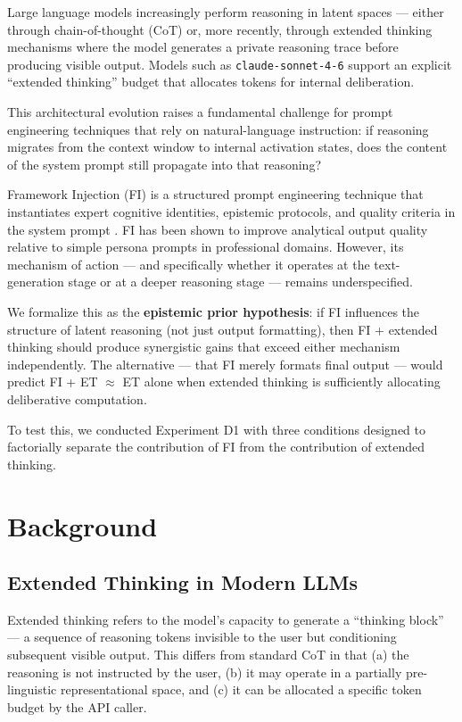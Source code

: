 \documentclass[11pt,a4paper]{article}
\begin{document}
Large language models increasingly perform reasoning in latent spaces — either
through chain-of-thought (CoT) \citep{wei2022chain} or, more recently, through
extended thinking mechanisms where the model generates a private reasoning trace
before producing visible output. Models such as \texttt{claude-sonnet-4-6}
support an explicit ``extended thinking'' budget that allocates tokens for
internal deliberation.

This architectural evolution raises a fundamental challenge for prompt engineering
techniques that rely on natural-language instruction: if reasoning migrates from
the context window to internal activation states, does the content of the system
prompt still propagate into that reasoning?

Framework Injection (FI) is a structured prompt engineering technique that
instantiates expert cognitive identities, epistemic protocols, and quality
criteria in the system prompt \citep{gomes2025fi}. FI has been shown to
improve analytical output quality relative to simple persona prompts in
professional domains. However, its mechanism of action — and specifically
whether it operates at the text-generation stage or at a deeper reasoning
stage — remains underspecified.

We formalize this as the \textbf{epistemic prior hypothesis}: if FI influences
the structure of latent reasoning (not just output formatting), then
FI + extended thinking should produce synergistic gains that exceed either
mechanism independently. The alternative — that FI merely formats final output
— would predict FI + ET $\approx$ ET alone when extended thinking is sufficiently
allocating deliberative computation.

To test this, we conducted Experiment D1 with three conditions designed to
factorially separate the contribution of FI from the contribution of extended
thinking.

\section{Background}

\subsection{Extended Thinking in Modern LLMs}

Extended thinking refers to the model's capacity to generate a ``thinking
block'' — a sequence of reasoning tokens invisible to the user but conditioning
subsequent visible output. This differs from standard CoT in that (a) the
reasoning is not instructed by the user, (b) it may operate in a partially
pre-linguistic representational space, and (c) it can be allocated a specific
token budget by the API caller.
\end{document}
